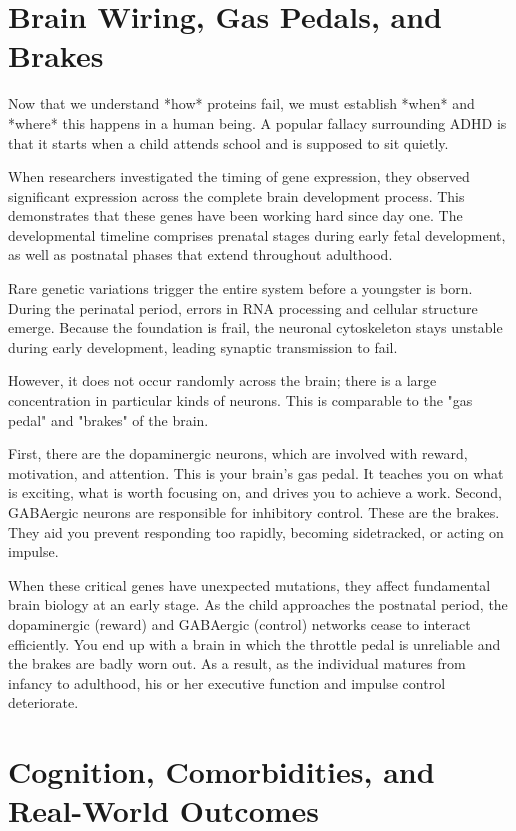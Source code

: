 \section{Brain Wiring, Gas Pedals, and Brakes}  

Now that we understand *how* proteins fail, we must establish *when* and *where* this happens in a human being.  A popular fallacy surrounding ADHD is that it starts when a child attends school and is supposed to sit quietly.  

When researchers investigated the timing of gene expression, they observed significant expression across the complete brain development process.  This demonstrates that these genes have been working hard since day one.  The developmental timeline comprises prenatal stages during early fetal development, as well as postnatal phases that extend throughout adulthood.  

Rare genetic variations trigger the entire system before a youngster is born.  During the perinatal period, errors in RNA processing and cellular structure emerge.  Because the foundation is frail, the neuronal cytoskeleton stays unstable during early development, leading synaptic transmission to fail.  

However, it does not occur randomly across the brain; there is a large concentration in particular kinds of neurons.  This is comparable to the "gas pedal" and "brakes" of the brain.  

First, there are the dopaminergic neurons, which are involved with reward, motivation, and attention.  This is your brain's gas pedal.  It teaches you on what is exciting, what is worth focusing on, and drives you to achieve a work.  Second, GABAergic neurons are responsible for inhibitory control. 
These are the brakes.  They aid you prevent responding too rapidly, becoming sidetracked, or acting on impulse.  

When these critical genes have unexpected mutations, they affect fundamental brain biology at an early stage.  As the child approaches the postnatal period, the dopaminergic (reward) and GABAergic (control) networks cease to interact efficiently. 
You end up with a brain in which the throttle pedal is unreliable and the brakes are badly worn out.  As a result, as the individual matures from infancy to adulthood, his or her executive function and impulse control deteriorate.  

\section{Cognition, Comorbidities, and Real-World Outcomes}  

